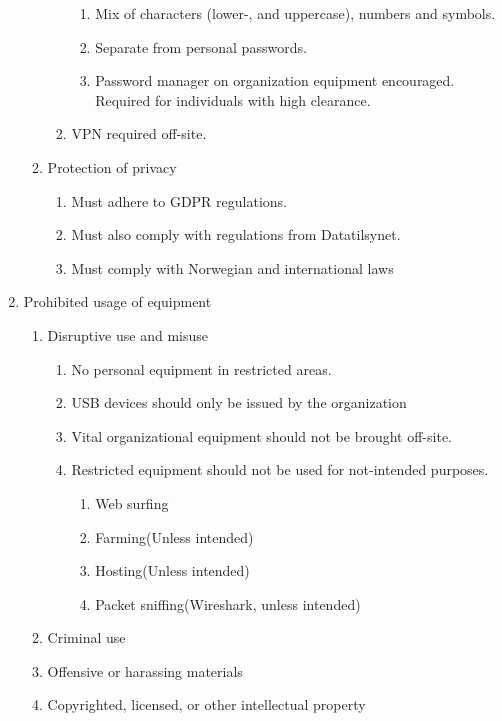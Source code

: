 \begin{enumerate}
\begin{enumerate}
\begin{enumerate}
\begin{enumerate}
        \item Mix of characters (lower-, and uppercase), numbers and symbols.
        \item Separate from personal passwords.
        \item Password manager on organization equipment encouraged. Required for individuals with high clearance.
      \end{enumerate}
      \item VPN required off-site.
    \end{enumerate}
    \item Protection of privacy
    \begin{enumerate}
      \item Must adhere to GDPR regulations.
      \item Must also comply with regulations from Datatilsynet.
      \item Must comply with Norwegian and international laws
    \end{enumerate}
  \end{enumerate}
  \item Prohibited usage of equipment
  \begin{enumerate}
    \item Disruptive use and misuse
    \begin{enumerate}
      \item No personal equipment in restricted areas.
      \item USB devices should only be issued by the organization
      \item Vital organizational equipment should not be brought off-site.
      \item Restricted equipment should not be used for not-intended purposes.
      \begin{enumerate}
        \item Web surfing
        \item Farming(Unless intended)
        \item Hosting(Unless intended)
        \item Packet sniffing(Wireshark, unless intended)
      \end{enumerate}
    \end{enumerate}
    \item Criminal use
    \item Offensive or harassing materials
    \item Copyrighted, licensed, or other intellectual property
  \end{enumerate}

\end{enumerate}
